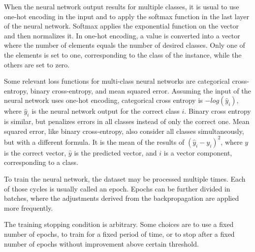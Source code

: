 {\color{red}
When the neural network output results for multiple classes, it is usual to use one-hot encoding in the input and to apply the softmax function in the last layer of the neural network.
Softmax applies the exponential function on the vector and then normalizes it.
In one-hot encoding, a value is converted into a vector where the number of elements equals the number of desired classes. Only one of the elements is set to one, corresponding to the class of the instance, while the others are set to zero.

Some relevant loss functions for multi-class neural networks are categorical cross-entropy, binary cross-entropy, and mean squared error. 
Assuming the input of the neural network uses one-hot encoding, categorical cross entropy is $-log(\hat{y}_i)$, where $\hat{y}_i$ is the neural network output for the correct class $i$. Binary cross entropy is similar, but penalizes errors in all classes instead of only the correct one. Mean squared error, like binary cross-entropy, also consider all classes simultaneously, but with a different formula. It is the mean of the results of $(\hat{y}_i - y_i)^2$, where $y$ is the correct vector, $\hat{y}$ is the predicted vector, and $i$ is a vector component, corresponding to a class.

To train the neural network, the dataset may be processed multiple times. Each of those cycles is usually called an epoch. Epochs can be further divided in batches, where the adjustments derived from the backpropagation are applied more frequently.

The training stopping condition is arbitrary. Some choices are to use a fixed number of epochs, to train for a fixed period of time, or to stop after a fixed number of epochs without improvement above certain threshold.
}